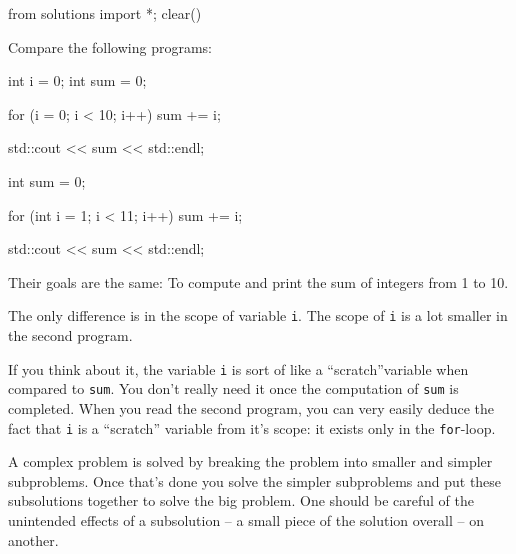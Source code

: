 \begin{python0}
from solutions import *; clear()
\end{python0}

Compare the following programs:
\begin{console}
int i = 0;
int sum = 0;

for (i = 0; i < 10; i++)
{   
    sum += i;
}

std::cout << sum << std::endl;
\end{console}

\begin{console}
int sum = 0;

for (int i = 1; i < 11; i++)
{   
    sum += i;
}

std::cout << sum << std::endl;
\end{console}

Their goals are the same: To compute and print the sum of integers from
1 to 10.

The only difference is in the scope of variable \texttt{i}. The scope of
\texttt{i} is a lot smaller in the second program.

If you think about it, the variable \texttt{i} is sort of like a
``scratch''variable when compared to \texttt{sum}. You
don't really need it once the computation of \texttt{sum}
is completed. When you read the second program, you can very easily
deduce the fact that \texttt{i} is a ``scratch'' variable from
it's scope: it exists only in the \texttt{for}-loop.

A complex problem is solved by breaking the problem into smaller and
simpler subproblems. Once that's done you solve the
simpler subproblems and put these subsolutions together to solve the big
problem. One should be careful of the unintended effects of a
subsolution -- a small piece of the solution overall -- on another.

